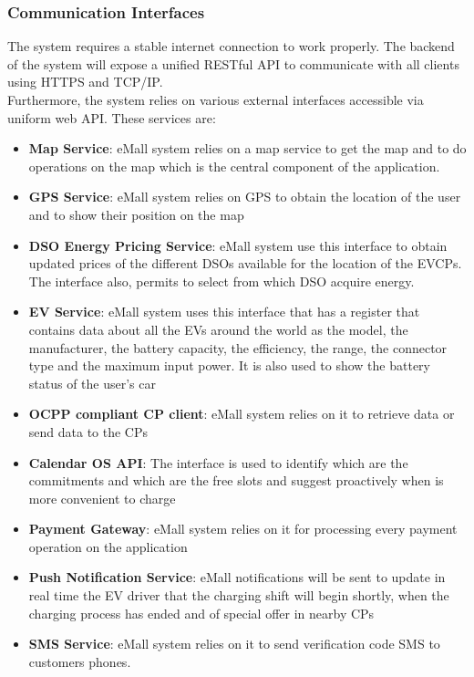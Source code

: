 \subsubsection{Communication Interfaces}
The system requires a stable internet connection to work properly.
The backend of the system will expose a unified RESTful API to communicate
with all clients using HTTPS and TCP/IP.
\\Furthermore, the system relies on various external interfaces accessible via uniform web API. These services are:
\begin{itemize}
    \item \textbf{Map Service}: eMall system relies on a map service to get the map and to do operations on the map which is the central component of the application.
    \item \textbf{GPS Service}: eMall system relies on GPS to obtain the location of the user and to show their position on the map
    \item \textbf{DSO Energy Pricing Service}: eMall system use this interface to obtain updated prices of the different DSOs available for the location of the EVCPs. The interface also, permits to select from which DSO acquire energy.
    \item \textbf{EV Service}: eMall system uses this interface that has a register that contains data about all the EVs around the world as the model, the manufacturer, the battery capacity, the efficiency, the range, the connector type and the maximum input power. It is also used to show the battery status of the user's car
    \item \textbf{OCPP compliant CP client}: eMall system relies on it to retrieve data or send data to the CPs
    \item \textbf{Calendar OS API}: The interface is used to identify which are the commitments and which are the free slots and suggest proactively when is more convenient to charge
    \item \textbf{Payment Gateway}: eMall system relies on it for processing every payment operation on the application
    \item \textbf{Push Notification Service}: eMall notifications will be sent to update in real time the EV driver that the charging shift will begin shortly, when the charging process has ended and of special offer in nearby CPs
    \item \textbf{SMS Service}: eMall system relies on it to send verification code SMS to customers phones.
\end{itemize}

